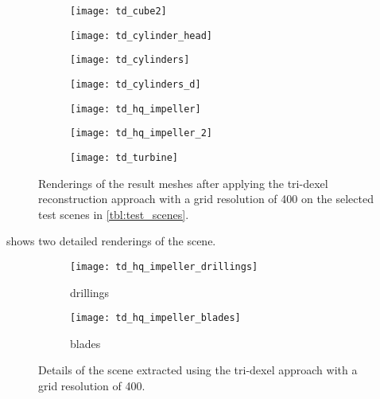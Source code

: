 \begin{figure}
	\centering
	\begin{subfigure}[b]{0.34\textwidth}
		\centering
		\texttt{[image: td\_cube2]}
		\caption{\cubes}
		\label{fig:td_cube2}
	\end{subfigure}
	\hspace{1cm}
	\begin{subfigure}[b]{0.34\textwidth}
		\centering
		\texttt{[image: td\_cylinder\_head]}
		\caption{\cylinderhead}
		\label{fig:td_cylinder_head}
	\end{subfigure}
	\begin{subfigure}[b]{0.34\textwidth}
		\centering
		\texttt{[image: td\_cylinders]}
		\caption{\cylinders}
		\label{fig:td_cylinders}
	\end{subfigure}
	\hspace{1cm}
	\begin{subfigure}[b]{0.34\textwidth}
		\centering
		\texttt{[image: td\_cylinders\_d]}
		\caption{\cylindersd}
		\label{fig:td_cylinders_delaunay}
	\end{subfigure}
	\begin{subfigure}[b]{0.34\textwidth}
		\centering
		\texttt{[image: td\_hq\_impeller]}
		\caption{\impeller}
		\label{fig:td_hq_impeller}
	\end{subfigure}
	\hspace{1cm}
	\begin{subfigure}[b]{0.34\textwidth}
		\centering
		\texttt{[image: td\_hq\_impeller\_2]}
		\caption{\impellerhalf}
		\label{fig:td_hq_impeller_2}
	\end{subfigure}
	\begin{subfigure}[b]{0.33\textwidth}
		\centering
		\texttt{[image: td\_turbine]}
		\caption{\turbine}
		\label{fig:td_turbine}
	\end{subfigure}
	\caption{
		Renderings of the result meshes after applying the tri-dexel reconstruction approach with a grid resolution of 400 on the selected test scenes in \cref{tbl:test_scenes}.
	}
	\label{fig:td_results}
\end{figure}

 shows two detailed renderings of the \impeller scene.

\begin{figure}
	\centering
	\begin{subfigure}[b]{0.49\textwidth}
		\centering
		\texttt{[image: td\_hq\_impeller\_drillings]}
		\caption{\impeller drillings}
		\label{fig:td_hq_impeller_drillings}
	\end{subfigure}
	\begin{subfigure}[b]{0.49\textwidth}
		\centering
		\texttt{[image: td\_hq\_impeller\_blades]}
		\caption{\impeller blades}
		\label{fig:td_hq_impeller_blades}
	\end{subfigure}
	\caption{
		Details of the \impeller scene extracted using the tri-dexel approach with a grid resolution of 400.
	}
	\label{fig:td_hq_impeller_details}
\end{figure}

